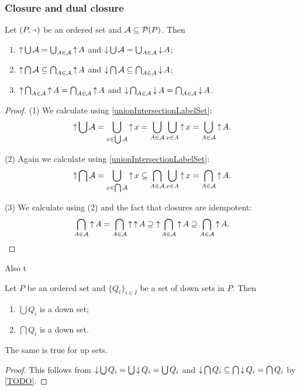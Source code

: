 \subsubsection{Closure and dual closure}

\begin{corollary} \label{upDownsetUnionIntersection}
Let $\sSet{P,\Yleft}$ be an ordered set and $\mathcal{A}\subseteq \operatorname{\mathcal{P}}(P)$. Then
\begin{enumerate}
\item $\operatorname{\uparrow} \bigcup \mathcal{A} = \bigcup_{A\in \mathcal{A}} \operatorname{\uparrow} A$ and $\operatorname{\downarrow} \bigcup \mathcal{A} = \bigcup_{A\in \mathcal{A}} \operatorname{\downarrow} A$;
\item $\operatorname{\uparrow} \bigcap \mathcal{A} \subseteq \bigcap_{A\in \mathcal{A}} \operatorname{\uparrow} A$ and $\operatorname{\downarrow} \bigcap \mathcal{A} \subseteq \bigcap_{A\in \mathcal{A}} \operatorname{\downarrow} A$;
\item $\operatorname{\uparrow} \bigcap_{A\in \mathcal{A}} \operatorname{\uparrow} A = \bigcap_{A\in \mathcal{A}} \operatorname{\uparrow} A$ and $\operatorname{\downarrow} \bigcap_{A\in \mathcal{A}} \operatorname{\downarrow} A = \bigcap_{A\in \mathcal{A}} \operatorname{\downarrow} A$.
\end{enumerate}
\end{corollary}
\begin{proof}
(1) We calculate using \ref{unionIntersectionLabelSet}:
\[ \operatorname{\uparrow} \bigcup \mathcal{A} = \bigcup_{x\in \bigcup\mathcal{A}} \operatorname{\uparrow} x = \bigcup_{A\in \mathcal{A}}\bigcup_{x\in A}\operatorname{\uparrow} x = \bigcup_{A\in \mathcal{A}} \operatorname{\uparrow} A. \]

(2) Again we calculate using \ref{unionIntersectionLabelSet}:
\[ \operatorname{\uparrow} \bigcap \mathcal{A} = \bigcup_{x\in \bigcap\mathcal{A}} \operatorname{\uparrow} x \subseteq \bigcap_{A\in \mathcal{A}}\bigcup_{x\in A}\operatorname{\uparrow} x = \bigcap_{A\in \mathcal{A}} \operatorname{\uparrow} A. \]

(3) We calculate using (2) and the fact that closures are idempotent:
\[ \bigcap_{A\in \mathcal{A}} \operatorname{\uparrow} A = \bigcap_{A\in \mathcal{A}} \operatorname{\uparrow}\operatorname{\uparrow} A \supseteq \operatorname{\uparrow} \bigcap_{A\in \mathcal{A}} \operatorname{\uparrow} A \supseteq \bigcap_{A\in \mathcal{A}} \operatorname{\uparrow} A. \]
\end{proof}
Also t
\begin{corollary} \label{unionIntersectionDownUpSets}
Let $P$ be an ordered set and $\{Q_i\}_{i\in I}$ be a set of down sets in $P$. Then
\begin{enumerate}
\item $\bigcup Q_i$ is a down set;
\item $\bigcap Q_i$ is a down set.
\end{enumerate}
The same is true for up sets.
\end{corollary}
\begin{proof}
This follows from $\operatorname{\downarrow} \bigcup Q_i = \bigcup \operatorname{\downarrow} Q_i = \bigcup Q_i$ and $\operatorname{\downarrow} \bigcap Q_i \subseteq \bigcap \operatorname{\downarrow} Q_i = \bigcap Q_i$ by \ref{TODO}.
\end{proof}

